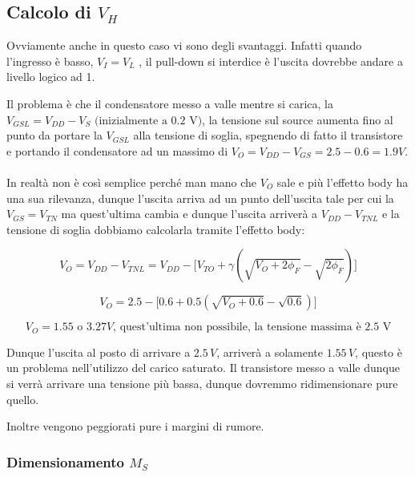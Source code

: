 \newpage
\subsection{Calcolo di $V_H$}
Ovviamente anche in questo caso vi sono degli svantaggi. Infatti quando l'ingresso è basso, $V_I =V_L$ , il pull-down si interdice è l'uscita dovrebbe andare a livello logico ad 1.

Il problema è che il condensatore messo a valle mentre si carica, la $V_{GSL} = V_{DD} - V_{S} \text{ (inizialmente a 0.2 V)}$, la tensione sul source aumenta fino al punto da portare la $V_{GSL}$ alla tensione di soglia, spegnendo di fatto il transistore e portando il condensatore ad un massimo di $V_O = V_{DD} - V_{GS} = 2.5 - 0.6 = 1.9V$.
\paragraph{}
In realtà non è così semplice perché man mano che $V_O$ sale e più l'effetto body ha una sua rilevanza, dunque l'uscita arriva ad un punto dell'uscita tale per cui la $V_{GS} = V_{TN}$ ma quest'ultima cambia e dunque l'uscita arriverà a $V_{DD} - V_{TNL}$ e la tensione di soglia dobbiamo calcolarla tramite l'effetto body:

\begin{equation*}
    V_O = V_{DD} - V_{TNL} = V_{DD} - \Big[V_{TO} + \gamma(\sqrt{V_O + 2\phi_F} - \sqrt{2\phi_F})\Big]
\end{equation*}

\begin{equation*}
    V_O = 2.5 - \Big[0.6 + 0.5(\sqrt{V_O + 0.6} - \sqrt{0.6})\Big]
\end{equation*}

\begin{equation*}
    V_O = 1.55 \text{ o } 3.27 V \text{, quest'ultima non possibile, la tensione massima è 2.5 V}
\end{equation*}

Dunque l'uscita al posto di arrivare a $2.5\,V$, arriverà a solamente $ 1.55\,V$, questo è un problema nell'utilizzo del carico saturato. Il transistore messo a valle dunque si verrà arrivare una tensione più bassa, dunque dovremmo ridimensionare pure quello.

Inoltre vengono peggiorati pure i margini di rumore.


\subsubsection{Dimensionamento $M_S$}


